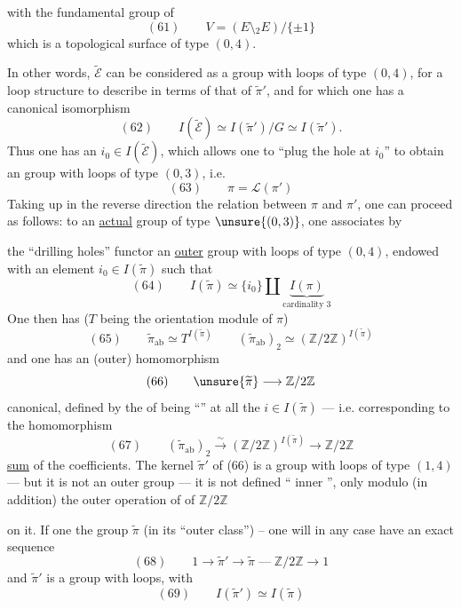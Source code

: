 
with the fundamental group of
\[
(61)\qquad V=(E\setminus {}_2E)/\{\pm1\}
\]
which is a topological surface of type $(0,4)$.

In other words, $\widetilde{\mathcal E}$ can be considered as a group with loops of type $(0,4)$, for a loop structure  to describe in terms of that of $\widetilde{\pi}'$, and for which one has a canonical isomorphism
\[
(62)\qquad I(\widetilde{\mathcal E})\simeq I(\widetilde{\pi}')/G\simeq I(\widetilde{\pi}').
\]
Thus one has an $i_0\in I(\widetilde{\mathcal E})$, which allows one to ``plug the hole at $i_0$'' to obtain an  group with loops of type $(0,3)$, i.e. \deleted{$\unsure{\pi=}$}
\[
(63)\qquad \pi=\mathcal L(\pi')
\]
Taking up in the reverse direction the relation between $\pi$ and $\pi'$, one can proceed as follows: to an \uline{actual} group  of type $\unsure{(0,3)}$, one associates by


the ``drilling holes'' functor an \uline{outer} group with loops  of type $(0,4)$, endowed with an element $i_0\in I(\widetilde{\pi})$ such that 
\[
(64)\qquad I(\widetilde{\pi})\simeq\{i_0\}\amalg\underbrace{I(\pi)}_{\text{cardinality }3}
\]
One then has ($T$ being the orientation module of $\pi$)
\[
(65)\qquad \widetilde{\pi}_{\mathrm{ab}}\simeq T^{I(\widetilde{\pi})}\qquad (\widetilde{\pi}_{\mathrm{ab}})_2\simeq(\mathbb Z/2\mathbb Z)^{I(\widetilde{\pi})}
\]
and one has an (outer) homomorphism
\[
(66)\qquad \unsure{\widetilde{\pi}}\longrightarrow\mathbb Z/2\mathbb Z
\]
canonical, defined by the  of being ``'' at all the $i\in I(\widetilde{\pi})$ --- i.e. corresponding to the homomorphism
\[
(67)\qquad (\widetilde{\pi}_{\mathrm{ab}})_2\xrightarrow{\sim}(\mathbb Z/2\mathbb Z)^{I(\widetilde{\pi})}\longrightarrow\mathbb Z/2\mathbb Z
\]
\uline{sum} of the coefficients. The kernel $\widetilde{\pi}'$ of (66) is a group with loops of type $(1,4)$ --- but it is not  an outer group --- it is not defined `` inner '',  only modulo (in addition) the outer operation of  of $\mathbb Z/2\mathbb Z$



on it. If one  the group $\widetilde{\pi}$ (in its ``outer class'') -- one will in any case have an exact sequence
\[
(68)\qquad 1\longrightarrow\widetilde{\pi}'\longrightarrow\widetilde{\pi}\mathrel{\text{---}}\mathbb Z/2\mathbb Z\longrightarrow 1
\]
and $\widetilde{\pi}'$ is a group with loops, with
\[
(69)\qquad I(\widetilde{\pi}')\simeq I(\widetilde{\pi})
\]

